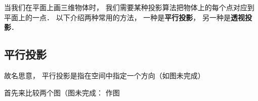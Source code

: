

当我们在平面上画三维物体时， 我们需要某种投影算法把物体上的每个点对应到平面上的一点． 以下介绍两种常用的方法， 一种是\textbf{平行投影}， 另一种是\textbf{透视投影}．

\subsection{平行投影}
故名思意， 平行投影是指在空间中指定一个方向（如图未完成）


首先来比较两个图（图未完成： 作图